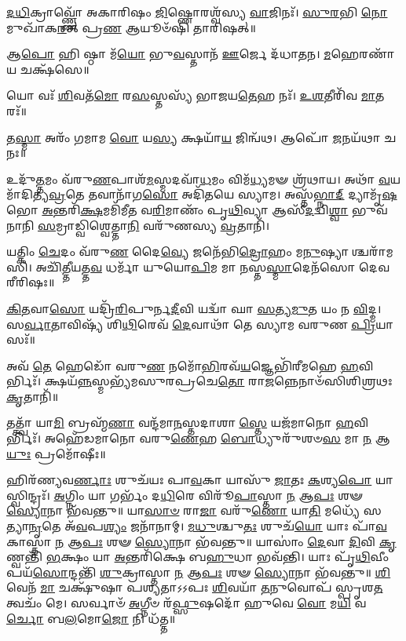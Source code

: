 \-\ul{𑌦}\-\-\ul{𑌧𑌿}\-𑌕𑍍𑌰𑌾𑌵𑍍𑌣𑍍𑌣𑍋᳴ 𑌅𑌕𑌾𑌰𑌿𑌷𑌂 \ul{𑌜𑌿}\-𑌷𑍍𑌣𑍋𑌰𑌶𑍍𑌵᳴𑌸𑍍𑌯 \ul{𑌵𑌾}\-𑌜𑌿𑌨𑌃᳴।
\-\ul{𑌸𑍁}\-\-\ul{𑌰}\-𑌭𑌿 \ul{𑌨𑍋} 𑌮𑍁𑌖𑌾᳴𑌕\-\ul{𑌰}\-𑌤𑍍 𑌪𑍍𑌰\-\ul{𑌣} 𑌆𑌯𑍂𑍞᳴𑌷𑌿 𑌤𑌾𑌰𑌿𑌷𑌤𑍍॥

𑌆\-\ul{𑌪𑍋} 𑌹𑌿 𑌷𑍍𑌠𑌾 𑌮᳴\-\ul{𑌯𑍋} 𑌭𑍁\-\ul{𑌵}\-𑌸𑍍𑌤𑌾𑌨᳴ \ul{𑌊}\-𑌰𑍍𑌜𑍇 𑌦᳴𑌧𑌾𑌤𑌨। \ul{𑌮}\-𑌹𑍇𑌰𑌣𑌾᳴𑌯 𑌚𑌕𑍍𑌷᳴𑌸𑍇॥

𑌯𑍋 𑌵𑌃᳴ \ul{𑌶𑌿}\-𑌵𑌤᳴\-\ul{𑌮𑍋} 𑌰\-\ul{𑌸}\-𑌸𑍍𑌤𑌸𑍍𑌯᳴ 𑌭𑌾𑌜𑌯\-\ul{𑌤𑍇}\-𑌹 𑌨𑌃᳴। \ul{𑌉}\-\-\ul{𑌶}\-𑌤𑍀𑌰𑌿᳴𑌵 \ul{𑌮𑌾}\-𑌤𑌰𑌃᳴॥

𑌤\-\ul{𑌸𑍍𑌮𑌾} 𑌅𑌰𑌂᳴ 𑌗𑌮𑌾𑌮 \ul{𑌵𑍋} 𑌯\-\ul{𑌸𑍍𑌯} 𑌕𑍍𑌷𑌯𑌾᳴\-\ul{𑌯} 𑌜𑌿𑌨𑍍𑌵᳴𑌥। 𑌆𑌪𑍋᳴ \ul{𑌜}\-𑌨𑌯᳴𑌥𑌾 𑌚 𑌨𑌃॥

𑌉𑌦𑍁᳴\-\ul{𑌤𑍍𑌤}\-𑌮𑌂 𑌵᳴𑌰𑍁\-\ul{𑌣}\-𑌪𑌾𑌶᳴\-\ul{𑌮}\-𑌸𑍍𑌮𑌦𑌵𑌾᳴\-\ul{𑌧}\-𑌮𑌂 𑌵𑌿𑌮᳴\-\ul{𑌧𑍍𑌯}\-𑌮𑍟 𑌶𑍍𑌰᳴𑌥𑌾𑌯।
𑌅𑌥𑌾᳴ \ul{𑌵}\-𑌯𑌮𑌾᳴𑌦𑌿𑌤𑍍𑌯\-\ul{𑌵𑍍𑌰}\-𑌤𑍇 𑌤𑌵𑌾𑌨𑌾᳴𑌗\-\ul{𑌸𑍋} 𑌅𑌦𑌿᳴𑌤𑌯𑍇 𑌸𑍍𑌯𑌾𑌮।
𑌅𑌸𑍍𑌤᳴\-\ul{𑌭𑍍𑌨𑌾}\-\-\ul{𑌦𑍍} 𑌦𑍍𑌯𑌾𑌮𑍃᳴\-\ul{𑌷}\-𑌭𑍋 \ul{𑌅}\-𑌨𑍍𑌤𑌰𑌿᳴\-\ul{𑌕𑍍𑌷}\-𑌮𑌮𑌿᳴𑌮𑍀𑌤 𑌵\-\ul{𑌰𑌿}\-𑌮𑌾𑌣𑌂᳴ 𑌪𑍃\-\ul{𑌥𑌿}\-𑌵𑍍𑌯𑌾
𑌆𑌸𑍀᳴\-\ul{𑌦}\-𑌦𑍍𑌵𑌿\-\ul{𑌶𑍍𑌵𑌾} 𑌭𑍁𑌵᳴𑌨𑌾𑌨𑌿 \ul{𑌸}\-𑌮𑍍𑌰𑌾𑌡𑍍𑌵𑌿𑌶𑍍𑌵𑍇𑌤𑍍𑌤𑌾\-\ul{𑌨𑌿} 𑌵𑌰𑍁᳴𑌣𑌸𑍍𑌯 \ul{𑌵𑍍𑌰}\-𑌤𑌾𑌨𑌿᳴।

𑌯𑌤𑍍𑌕𑌿𑌂 \ul{𑌚𑍇}\-𑌦𑌂 𑌵᳴𑌰𑍁\-\ul{𑌣} 𑌦𑍈\-\ul{𑌵𑍍𑌯𑍇} 𑌜𑌨𑍇᳴𑌭𑌿\-\ul{𑌦𑍍𑌰𑍋}\-𑌹𑌂 𑌮\-\ul{𑌨𑍁}\-𑌷𑍍𑌯𑌾𑌶𑍍𑌚𑌰𑌾᳴𑌮𑌸𑌿। 
𑌅𑌚𑌿᳴\-\ul{𑌤𑍍𑌤𑍀}\-𑌯𑌤𑍍𑌤\-\ul{𑌵} 𑌧𑌰𑍍𑌮𑌾᳴ 𑌯𑍁𑌯𑍋\-\ul{𑌪𑌿}\-𑌮 𑌮𑌾 \ul{𑌨}\-𑌸𑍍𑌤\-\ul{𑌸𑍍𑌮𑌾}\-𑌦𑍇𑌨᳴𑌸𑍋 𑌦𑍇𑌵 𑌰𑍀𑌰𑌿𑌷𑌃॥

\-\ul{𑌕𑌿}\-\-\ul{𑌤}\-𑌵𑌾\-\ul{𑌸𑍋} 𑌯𑌦𑍍𑌰𑌿᳴\-\ul{𑌰𑌿}\-𑌪𑍁𑌰𑍍𑌨\-\ul{𑌦𑍀}\-𑌵𑌿 𑌯𑌦𑍍𑌵𑌾᳴ 𑌘𑌾 \ul{𑌸}\-𑌤𑍍𑌯\-\ul{𑌮𑍁}\-𑌤 𑌯𑌂 𑌨 \ul{𑌵𑌿}\-𑌦𑍍𑌮। 
𑌸\-\ul{𑌰𑍍𑌵𑌾}\-𑌤𑌾𑌵𑌿𑌷𑍍𑌯᳴ 𑌶𑌿\-\ul{𑌥𑌿}\-𑌰𑍇𑌵᳴ \ul{𑌦𑍇}\-𑌵𑌾𑌥𑌾᳴ 𑌤𑍇 𑌸𑍍𑌯𑌾𑌮 𑌵𑌰𑍁𑌣 \ul{𑌪𑍍𑌰𑌿}\-𑌯𑌾𑌸𑌃᳴॥

𑌅𑌵᳴ \ul{𑌤𑍇} 𑌹𑍇𑌡𑍋᳴ 𑌵𑌰𑍁\-\ul{𑌣} 𑌨𑌮𑍋᳴\-\ul{𑌭𑌿}\-𑌰𑌵᳴\-\ul{𑌯}\-𑌜𑍍𑌞𑍇𑌭𑌿᳴𑌰𑍀𑌮𑌹𑍇 \ul{𑌹}\-𑌵𑌿𑌰𑍍𑌭𑌿𑌃᳴।
𑌕𑍍𑌷𑌯᳴\-\ul{𑌨𑍍𑌨}\-𑌸𑍍𑌮𑌭𑍍𑌯᳴𑌮𑌸𑍁𑌰𑌪𑍍𑌰𑌚𑍇\-\ul{𑌤𑍋} 𑌰𑌾\-\ul{𑌜}\-𑌨𑍍𑌨𑍇𑌨𑌾𑍞᳴𑌸𑌿𑌶𑌿𑌶𑍍𑌰𑌥𑌃 \ul{𑌕𑍃}\-𑌤𑌾𑌨𑌿᳴॥

𑌤𑌤𑍍𑌤𑍍𑌵𑌾᳴ 𑌯𑌾\-\ul{𑌮𑌿} 𑌬𑍍𑌰𑌹𑍍𑌮᳴\-\ul{𑌣𑌾} 𑌵𑌨𑍍𑌦᳴𑌮𑌾\-\ul{𑌨}\-𑌸𑍍𑌤𑌦𑌾𑌶𑌾\-\ul{𑌸𑍍𑌤𑍇} 𑌯𑌜᳴𑌮𑌾𑌨𑍋 \ul{𑌹}\-𑌵𑌿𑌰𑍍𑌭𑌿𑌃᳴। 
𑌅𑌹𑍇᳴𑌡𑌮𑌾𑌨𑍋 𑌵𑌰𑍁\-\ul{𑌣𑍇}\-𑌹 \ul{𑌬𑍋}\-𑌧𑍍𑌯𑍁𑌰𑍁᳴𑌶𑍞\-\ul{𑌸} 𑌮𑌾 \ul{𑌨} 𑌆\-\ul{𑌯𑍁𑌃} 𑌪𑍍𑌰𑌮𑍋᳴𑌷𑍀𑌃॥

𑌹𑌿𑌰᳴𑌣𑍍𑌯𑌵\-\ul{𑌰𑍍𑌣𑌾𑌃} 𑌶𑍁𑌚᳴𑌯𑌃 𑌪𑌾\-\ul{𑌵}\-𑌕𑌾 𑌯𑌾𑌸𑍁᳴ \ul{𑌜𑌾}\-𑌤𑌃 \ul{𑌕}\-𑌶𑍍𑌯\-\ul{𑌪𑍋} 𑌯𑌾𑌸𑍍𑌵𑌿𑌨𑍍𑌦𑍍𑌰𑌃᳴।
\-\ul{𑌅}\-𑌗𑍍𑌨𑌿𑌂 𑌯𑌾 𑌗𑌰𑍍𑌭𑌂᳴ 𑌦\-\ul{𑌧𑌿}\-𑌰𑍇 𑌵𑌿𑌰𑍂᳴\-\ul{𑌪𑌾}\-𑌸𑍍𑌤𑌾 \ul{𑌨} 𑌆\-\ul{𑌪𑌃} 𑌶𑍟 \ul{𑌸𑍍𑌯𑍋}\-𑌨𑌾 𑌭᳴𑌵𑌨𑍍𑌤𑍁॥ 
𑌯𑌾\-\ul{𑌸𑌾}\-\-\ul{𑍞} 𑌰𑌾\-\ul{𑌜𑌾} 𑌵𑌰𑍁᳴\-\ul{𑌣𑍋} 𑌯𑌾\-\ul{𑌤𑌿} 𑌮𑌧𑍍𑌯𑍇᳴ 𑌸𑌤𑍍𑌯𑌾\-\ul{𑌨𑍃}\-𑌤𑍇 𑌅᳴\-\ul{𑌵}\-𑌪\-\ul{𑌶𑍍𑌯𑌂} 𑌜𑌨𑌾᳴𑌨𑌾𑌮𑍍।
\-\ul{𑌮}\-\-\ul{𑌧𑍁}\-𑌶𑍍𑌚𑍁\-\ul{𑌤𑌃} 𑌶𑍁𑌚᳴\-\ul{𑌯𑍋} 𑌯𑌾𑌃 𑌪𑌾᳴\-\ul{𑌵}\-𑌕𑌾𑌸𑍍𑌤𑌾 \ul{𑌨} 𑌆\-\ul{𑌪𑌃} 𑌶𑍟 \ul{𑌸𑍍𑌯𑍋}\-𑌨𑌾 𑌭᳴𑌵𑌨𑍍𑌤𑍁॥ 
𑌯𑌾𑌸𑌾𑌂॑ \ul{𑌦𑍇}\-𑌵𑌾 \ul{𑌦𑌿}\-𑌵𑌿 \ul{𑌕𑍃}\-𑌣𑍍𑌵𑌨𑍍𑌤𑌿᳴ \ul{𑌭}\-𑌕𑍍𑌷𑌂 𑌯𑌾 \ul{𑌅}\-𑌨𑍍𑌤𑌰𑌿᳴𑌕𑍍𑌷𑍇 𑌬\-\ul{𑌹𑍁}\-𑌧𑌾 𑌭𑌵᳴𑌨𑍍𑌤𑌿।
𑌯𑌾𑌃 𑌪𑍃᳴\-\ul{𑌥𑌿}\-𑌵𑍀𑌂 𑌪𑌯᳴\-\ul{𑌸𑍋}\-𑌨𑍍𑌦𑌨𑍍𑌤𑌿᳴ \ul{𑌶𑍁}\-𑌕𑍍𑌰𑌾𑌸𑍍𑌤𑌾 \ul{𑌨} 𑌆\-\ul{𑌪𑌃} 𑌶𑍟 \ul{𑌸𑍍𑌯𑍋}\-𑌨𑌾 𑌭᳴𑌵𑌨𑍍𑌤𑍁॥ 
\-\ul{𑌶𑌿}\-𑌵𑍇𑌨᳴ \ul{𑌮𑌾} 𑌚𑌕𑍍𑌷𑍁᳴𑌷𑌾 𑌪𑌶𑍍𑌯𑌤𑌾𑌽𑌽𑌪𑌃 \ul{𑌶𑌿}\-𑌵𑌯𑌾᳴ \ul{𑌤}\-𑌨𑍁𑌵𑍋𑌪᳴ 𑌸𑍍𑌪𑍃𑌶\-\ul{𑌤} 𑌤𑍍𑌵𑌚𑌂᳴ 𑌮𑍇।
𑌸𑌰𑍍𑌵𑌾𑍞᳴ \ul{𑌅}\-𑌗𑍍𑌨𑍀𑍞 𑌰᳴\-\ul{𑌫𑍍𑌸𑍁}\-𑌷𑌦𑍋᳴ 𑌹𑍁𑌵𑍇 \ul{𑌵𑍋} 𑌮\-\ul{𑌯𑌿} 𑌵\-\ul{𑌰𑍍𑌚𑍋} 𑌬\-\ul{𑌲}\-𑌮𑍋\-\ul{𑌜𑍋} 𑌨𑌿 𑌧᳴𑌤𑍍𑌤॥

